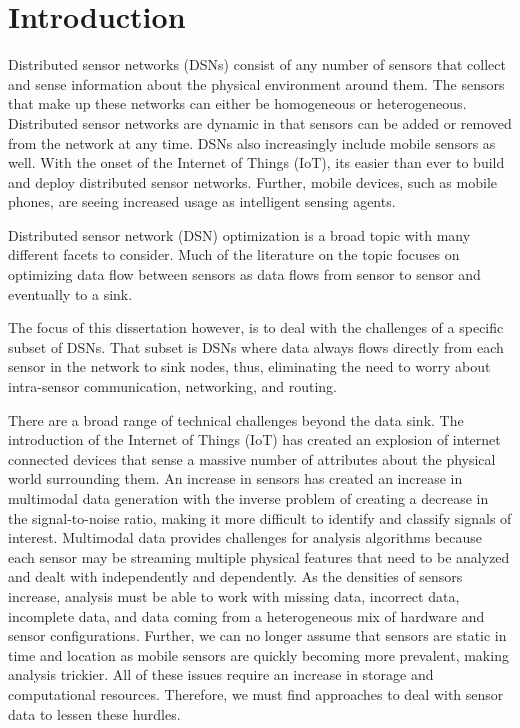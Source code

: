 \chapter{Introduction}
Distributed sensor networks (DSNs) consist of any number of sensors that collect and sense information about the physical environment around them. The sensors that make up these networks can either be homogeneous or heterogeneous. Distributed sensor networks are dynamic in that sensors can be added or removed from the network at any time. DSNs also increasingly include mobile sensors as well. With the onset of the Internet of Things (IoT), its easier than ever to build and deploy distributed sensor networks. Further, mobile devices, such as mobile phones, are seeing increased usage as intelligent sensing agents.

Distributed sensor network (DSN) optimization is a broad topic with many different facets to consider. Much of the literature on the topic focuses on optimizing data flow between sensors as data flows from sensor to sensor and eventually to a sink. 

The focus of this dissertation however, is to deal with the challenges of a specific subset of DSNs. That subset is DSNs where data always flows directly from each sensor in the network to sink nodes, thus, eliminating the need to worry about intra-sensor communication, networking, and routing. 

There are a broad range of technical challenges beyond the data sink. The introduction of the Internet of Things (IoT) has created an explosion of internet connected devices that sense a massive number of attributes about the physical world surrounding them. An increase in sensors has created an increase in multimodal data generation with the inverse problem of creating a decrease in the signal-to-noise ratio, making it more difficult to identify and classify signals of interest. Multimodal data provides challenges for analysis algorithms because each sensor may be streaming multiple physical features that need to be analyzed and dealt with independently and dependently. As the densities of sensors increase, analysis must be able to work with missing data, incorrect data, incomplete data, and data coming from a heterogeneous mix of hardware and sensor configurations. Further, we can no longer assume that sensors are static in time and location as mobile sensors are quickly becoming more prevalent, making analysis trickier. All of these issues require an increase in storage and computational resources. Therefore, we must find approaches to deal with sensor data to lessen these hurdles.

